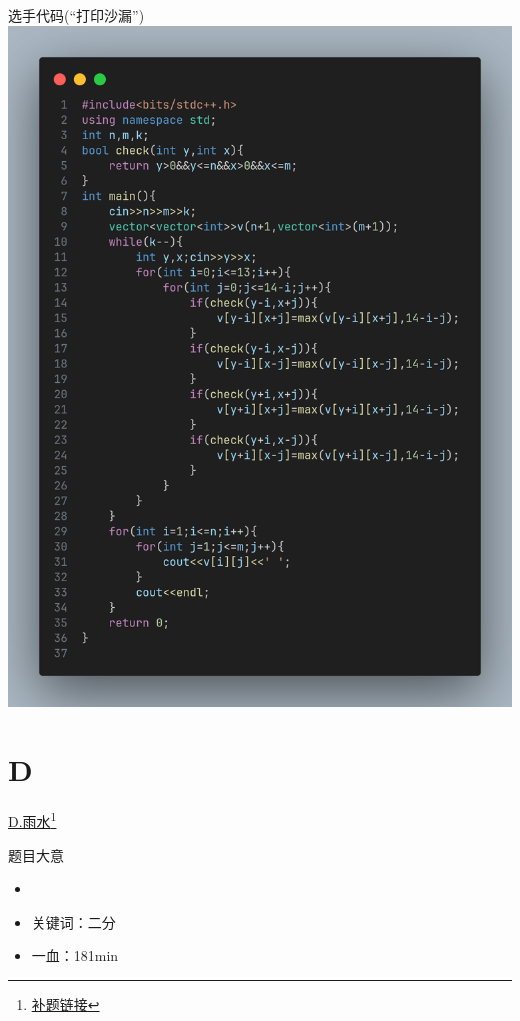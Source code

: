 \documentclass{beamer}
\begin{document}
    \begin{frame}{选手代码(“打印沙漏”)}
        \centering\includegraphics[scale=0.15]{images/std/C1.png}
    \end{frame}
    \section{D}
    \hypertarget{C}{}
    \begin{frame}{\hyperlink{toc}{D.雨水}\footnote{\href{https://acm816.cn/p/239}{\underline{补题链接}}}}
        \begin{block}{题目大意}
            \begin{itemize}
                \item 
                \item 关键词：二分
                \item 一血：181min
            \end{itemize}
        \end{block}
    \end{frame}
\end{document}
